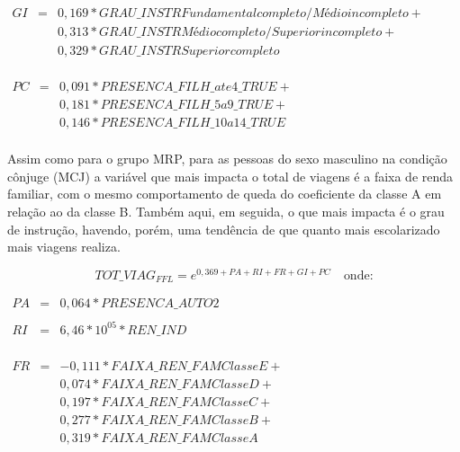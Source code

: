 \begin{math}
\begin{array} {rcl}
GI & = & 0,169*GRAU\_INSTRFundamental completo / Médio incompleto + \\
   &   & 0,313*GRAU\_INSTRMédio completo / Superior incompleto + \\
   &   & 0,329*GRAU\_INSTRSuperior completo \\  
\end{array}
\end{math}

\begin{math}
\begin{array} {rcl}
PC & = & 0,091*PRESENCA\_FILH\_ate4\_TRUE + \\
   &   & 0,181*PRESENCA\_FILH\_5a9\_TRUE +\\
   &   & 0,146*PRESENCA\_FILH\_10a14\_TRUE \\  
\end{array}
\end{math}

Assim como para o grupo MRP, para as pessoas do sexo masculino na condição cônjuge (MCJ) a variável que mais impacta o total de viagens é a faixa de renda familiar, com o mesmo comportamento de queda do coeficiente da classe A em relação ao da classe B.
Também aqui, em seguida, o que mais impacta é o grau de instrução, havendo, porém, uma tendência de que quanto mais escolarizado mais viagens realiza.

\begin{equation}\label{eq:quasi-poisson-GE} 
TOT\_VIAG _{FFL}= e^{0,369 + PA + RI + FR + GI + PC}
\quad \text{onde:}
\end{equation}

\begin{math}
\begin{array} {rcl}
PA & = & 0,064*PRESENCA\_AUTO2 \\  
   &   & \\
RI & = & 6,46*10^{05}*REN\_IND \\  
\end{array}
\end{math}

\begin{math}
\begin{array} {rcl}
FR & = & -0,111*FAIXA\_REN\_FAMClasse E + \\
   &   & 0,074*FAIXA\_REN\_FAMClasse D + \\
   &   & 0,197*FAIXA\_REN\_FAMClasse C + \\
   &   & 0,277*FAIXA\_REN\_FAMClasse B + \\      
   &   & 0,319*FAIXA\_REN\_FAMClasse A \\
\end{array}
\end{math}

